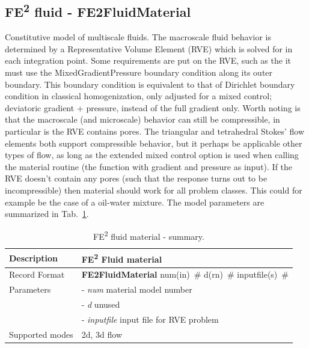 \documentclass[a4paper]{article}
\newcommand{\descitem}[1]{{\noindent \bf #1}}
\newcommand{\elemparam}[2]{{{#1\tiny (#2)}~\#}}
\newcommand{\param}[1]{{\it #1}}
\newenvironment{mmt}{\begin{tabular}{|l|p{9cm}|}}{\end{tabular}\\}
\newenvironment{mmt}{\begin{tabular}{|l|l|}}{\end{tabular}\\}
\begin{document}
\subsection{FE\textsuperscript{2} fluid - FE2FluidMaterial}
\label{FE2FluidMaterial}
Constitutive model of multiscale fluids.
The macroscale fluid behavior is determined by a Representative Volume Element (RVE) which is solved for in each integration point.
Some requirements are put on the RVE, such as the it must use the MixedGradientPressure boundary condition along its outer boundary. This boundary condition is equivalent to that of Dirichlet boundary condition in classical homogenization, only adjusted for a mixed control; deviatoric gradient + pressure, instead of the full gradient only.
Worth noting is that the macroscale (and microscale) behavior can still be compressible,  in particular is the RVE contains pores.
The triangular and tetrahedral Stokes' flow elements both support compressible behavior, but it perhaps be applicable other types of flow, as long as the extended mixed control option is used when calling the material routine (the function with gradient and pressure as input). If the RVE doesn't contain any pores (such that the response turns out to be incompressible) then material should work for all problem classes.
This could for example be the case of a oil-water mixture.
The model parameters are summarized in Tab.~\ref{FE2FluidMaterial_table}.

\begin{table}[!htb]
\centering
\begin{mmt}
\hline
Description & FE\textsuperscript{2} Fluid material\\
\hline
Record Format  & \descitem{FE2FluidMaterial} \elemparam{num}{in} \elemparam{d}{rn} \elemparam{inputfile}{s}\\
Parameters &- \param{num}       material model number\\
           &- \param{d}         unused\\
           &- \param{inputfile} input file for RVE problem\\
Supported modes&  2d, 3d flow\\
\hline
\end{mmt}
\caption{FE\textsuperscript{2} fluid material - summary.}
\label{FE2FluidMaterial_table}
\end{table}

\clearpage



\end{document}
